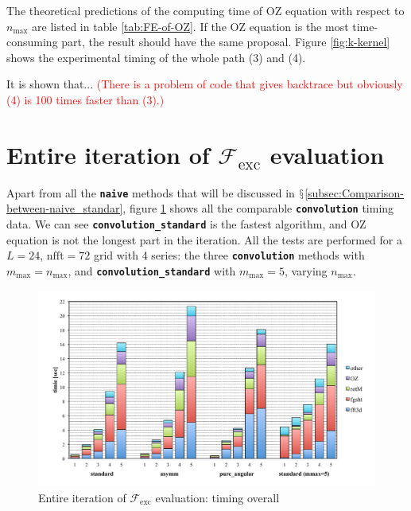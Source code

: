 The theoretical predictions of the computing time of \acs{OZ} equation
with respect to $n_{\max}$ are listed in table \ref{tab:FE-of-OZ}.
If the \acs{OZ} equation is the most time-consuming part, the result
should have the same proposal. Figure \ref{fig:k-kernel} shows the
experimental timing of the whole path (3) and (4).

It is shown that... \textcolor{red}{(There is a problem of code that
gives backtrace but obviously (4) is 100 times faster than (3).)}

\section{Entire iteration of $\mathcal{F}_{\mathrm{exc}}$ evaluation}

Apart from all the \texttt{\textbf{naive}} methods that will be discussed
in $\mathsection$\ref{subsec:Comparison-between-naive_standar},
figure \ref{fig:Entire-iteration} shows all the comparable \texttt{\textbf{convolution}}
timing data. We can see \texttt{\textbf{convolution\_standard}} is
the fastest algorithm, and OZ equation is not the longest part in
the iteration. All the tests are performed for a $L=24$, $\mathrm{nfft}=72$
grid with 4 series: the three \texttt{\textbf{convolution}} methods
with$m_{\max}=n_{\max}$, and \texttt{\textbf{convolution\_standard}}
with $m_{\max}=5$, varying $n_{\max}$.

\begin{figure}[H]
\begin{centering}
\includegraphics[bb=0cm 1cm 24cm 13cm,width=0.9\columnwidth]{_figure/results/branch_perf}
\par\end{centering}
\caption{Entire iteration of $\mathcal{F}_{\mathrm{exc}}$ evaluation: timing
overall \label{fig:Entire-iteration}}
\end{figure}


